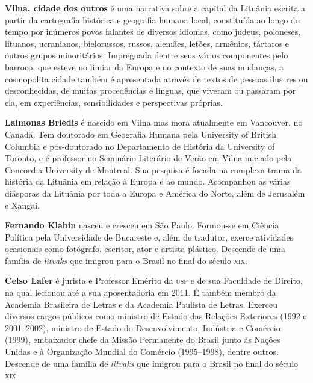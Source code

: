 \textbf{Vilna, cidade dos outros} é uma narrativa sobre a capital da Lituânia escrita a partir da cartografia histórica e geografia humana local, constituída ao longo do tempo por inúmeros povos falantes de diversos idiomas, como judeus, poloneses, lituanos, ucranianos, bielorussos, russos, alemães, letões, armênios, tártaros e outros grupos minoritários. Impregnada dentre seus vários componentes pelo barroco, que esteve no limiar da Europa e no contexto de suas mudanças, a cosmopolita cidade também é apresentada através de textos de pessoas ilustres ou desconhecidas, de muitas procedências e línguas, que viveram ou passaram por ela, em experiências, sensibilidades e perspectivas próprias.

\textbf{Laimonas Briedis} é nascido em Vilna mas mora atualmente em Vancouver, no Canadá. Tem doutorado em Geografia Humana pela University of British Columbia e pós-doutorado no Departamento de História da University of Toronto, e é professor no Seminário Literário de Verão em Vilna iniciado pela Concordia University de Montreal. Sua pesquisa é focada na complexa trama da história da Lituânia em relação à Europa e ao mundo. Acompanhou as várias diásporas da Lituânia por toda a Europa e América do Norte, além de Jerusalém e Xangai.

\textbf{Fernando Klabin} nasceu e cresceu em São Paulo. Formou-se em Ciência Política pela Universidade de Bucareste e, além de tradutor, exerce atividades ocasionais como fotógrafo, escritor, ator e artista plástico. Descende de uma família de \textit{litvaks} que imigrou para o Brasil no final do século \textsc{xix}.

\textbf{Celso Lafer} é jurista e Professor Emérito da \textsc{usp} e de sua Faculdade de Direito, na qual lecionou até a sua aposentadoria em 2011. É também membro da Academia Brasileira de Letras e da Academia Paulista de Letras. Exerceu diversos cargos públicos como ministro de Estado das Relações Exteriores (1992 e 2001--2002), ministro de Estado do Desenvolvimento, Indústria e Comércio (1999), embaixador chefe da Missão Permanente do Brasil junto às Nações Unidas e à Organização Mundial do Comércio (1995--1998), dentre outros. Descende de uma família de \textit{litvaks} que imigrou para o Brasil no final do século \textsc{xix}.




